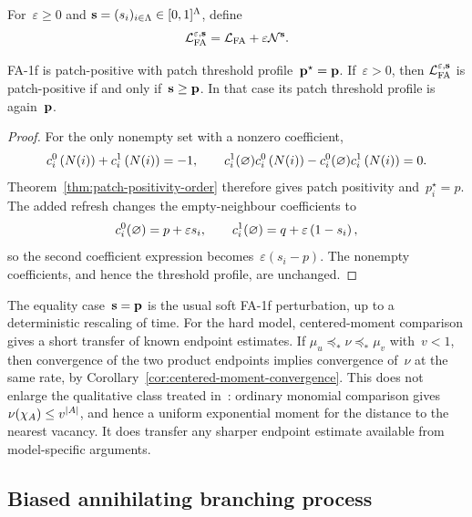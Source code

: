For~$\varepsilon\geq0$ and
$\mathbf{s}=(s_i)_{i\in\Lambda}\in[0,1]^\Lambda$, define
\begin{equation*}
\mathcal{L}_{\mathrm{FA}}^{\varepsilon,\mathbf{s}}
=
\mathcal{L}_{\mathrm{FA}}+\varepsilon\mathcal{N}^{\mathbf{s}}.
\end{equation*}

\begin{proposition}
\label{prop:fa-1f-patch-positivity}
FA-1f is patch-positive with patch threshold profile~$\mathbf{p}^\star=\mathbf{p}$.
If~$\varepsilon>0$, then
$\mathcal{L}_{\mathrm{FA}}^{\varepsilon,\mathbf{s}}$ is patch-positive if and only
if~$\mathbf{s}\geq\mathbf{p}$. In that case its patch threshold profile is again~$\mathbf{p}$.
\end{proposition}

\begin{proof}
For the only nonempty set with a nonzero coefficient,
\begin{equation*}
c_i^0\left(N(i)\right)+c_i^1\left(N(i)\right)=-1,
\qquad
c_i^1(\varnothing)c_i^0\left(N(i)\right)
-c_i^0(\varnothing)c_i^1\left(N(i)\right)=0.
\end{equation*}
Theorem~\ref{thm:patch-positivity-order} therefore gives patch positivity
and~$p_i^\star=p$. The added refresh changes the empty-neighbour coefficients
to
\begin{equation*}
c_i^0(\varnothing)=p+\varepsilon s_i,
\qquad
c_i^1(\varnothing)=q+\varepsilon\left(1-s_i\right),
\end{equation*}
so the second coefficient expression becomes~$\varepsilon(s_i-p)$. The
nonempty coefficients, and hence the threshold profile, are unchanged.
\end{proof}

The equality case~$\mathbf{s}=\mathbf{p}$ is the usual soft FA-1f perturbation, up to a
deterministic rescaling of time. For the hard model, centered-moment comparison
gives a short transfer of known endpoint estimates. If
$\mu_u\preceq_*\nu\preceq_*\mu_v$ with~$v<1$, then convergence of the two
product endpoints implies convergence of~$\nu$ at the same rate, by
Corollary~\ref{cor:centered-moment-convergence}. This does not enlarge the
qualitative class treated in~\cite{BlondelEtAl2013}: ordinary monomial
comparison gives~$\nu(\chi_A)\leq v^{\left|A\right|}$, and hence a uniform exponential
moment for the distance to the nearest vacancy. It does transfer any sharper
endpoint estimate available from model-specific arguments.

\subsection{Biased annihilating branching process}
\label{subsec:babp-applications}

